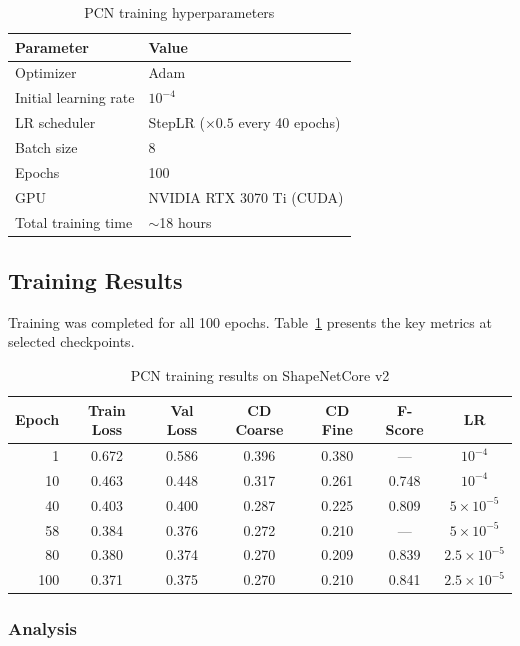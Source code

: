 \documentclass[a4paper, 12pt]{article}
\begin{document}
\begin{table}[H]
\centering
\caption{PCN training hyperparameters}
\begin{tabular}{ll}
\toprule
\textbf{Parameter} & \textbf{Value} \\
\midrule
Optimizer       & Adam \\
Initial learning rate & $10^{-4}$ \\
LR scheduler    & StepLR ($\times 0.5$ every 40 epochs) \\
Batch size      & 8 \\
Epochs          & 100 \\
GPU             & NVIDIA RTX 3070 Ti (CUDA) \\
Total training time & $\sim$18 hours \\
\bottomrule
\end{tabular}
\end{table}

\subsection{Training Results}

Training was completed for all 100 epochs. Table~\ref{tab:pcn-results} presents the key metrics at selected checkpoints.

\begin{table}[H]
\centering
\caption{PCN training results on ShapeNetCore v2}
\label{tab:pcn-results}
\begin{tabular}{rcccccc}
\toprule
\textbf{Epoch} & \textbf{Train Loss} & \textbf{Val Loss} & \textbf{CD Coarse} & \textbf{CD Fine} & \textbf{F-Score} & \textbf{LR} \\
\midrule
1   & 0.672 & 0.586 & 0.396 & 0.380 & ---   & $10^{-4}$ \\
10  & 0.463 & 0.448 & 0.317 & 0.261 & 0.748 & $10^{-4}$ \\
40  & 0.403 & 0.400 & 0.287 & 0.225 & 0.809 & $5 \times 10^{-5}$ \\
58  & 0.384 & 0.376 & 0.272 & 0.210 & ---   & $5 \times 10^{-5}$ \\
80  & 0.380 & 0.374 & 0.270 & 0.209 & 0.839 & $2.5 \times 10^{-5}$ \\
100 & 0.371 & 0.375 & 0.270 & 0.210 & 0.841 & $2.5 \times 10^{-5}$ \\
\bottomrule
\end{tabular}
\end{table}

\subsubsection{Analysis}
\end{document}
